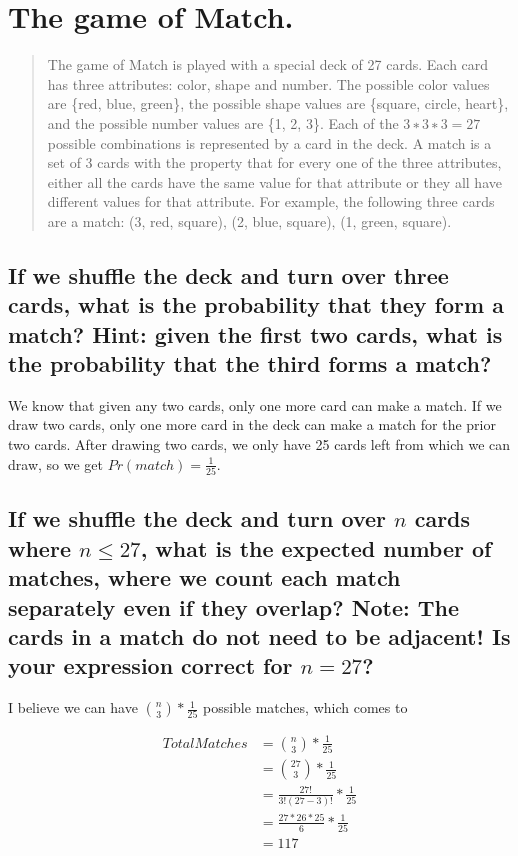\documentclass[titlepage]{article}\usepackage[]{graphicx}\usepackage[]{color}
\begin{document}
  \section{ The game of Match. }
  \begin{quote}
  The game of Match is played with a special deck of 27 cards. Each card has
  three attributes: color, shape and number. The possible color values are
  \{red, blue, green\}, the possible shape values are \{square, circle, heart\},
  and the possible number values are \{1, 2, 3\}. Each of the $3 ∗ 3 ∗ 3 = 27$
  possible combinations is represented by a card in the deck. A match is a set
  of 3 cards with the property that for every one of the three attributes,
  either all the cards have the same value for that attribute or they all have
  different values for that attribute. For example, the following three cards
  are a match: (3, red, square), (2, blue, square), (1, green, square).
  \end{quote}

\subsection{ If we shuffle the deck and turn over three cards, what is the
probability that they form a match? Hint: given the first two
cards, what is the probability that the third forms a match?}

We know that given any two cards, only one more card can make a match. If we
draw two cards, only one more card in the deck can make a match for the prior
two cards. After drawing two cards, we only have 25 cards left from which we
can draw, so we get $Pr(match) = \frac{1}{25}$. 

\subsection{ If we shuffle the deck and turn over $n$ cards where $n \leq 27$, what
is the expected number of matches, where we count each match
separately even if they overlap? Note: The cards in a match do
not need to be adjacent! Is your expression correct for $n = 27$?}

I believe we can have ${n \choose 3} * \frac{1}{25}$ possible matches, which
comes to 

\begin{align*}
	Total Matches &={n \choose 3} * \frac{1}{25} \\
              &= {27 \choose 3}   * \frac{1}{25} \\
              &=   \frac{27!}{3!(27-3)!} * \frac{1}{25} \\
				&= \frac{27 * 26 * 25}{6} * \frac{1}{25}  \\
				&= 117
\end{align*}
\end{document}
